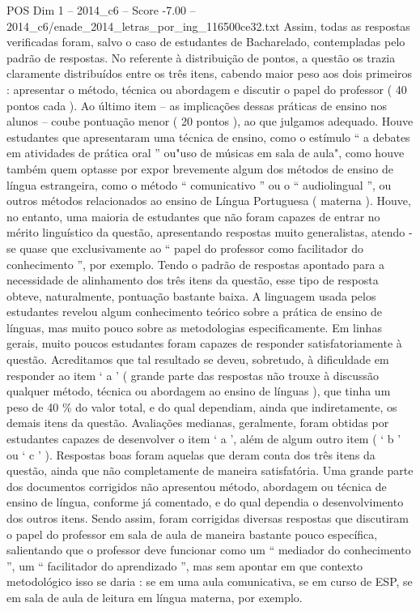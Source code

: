 \begin{textsample}{POS Dim 1 – 2014\_c6 – Score -7.00 – 2014\_c6/enade\_2014\_letras\_por\_ing\_116500ce32.txt}
Assim, todas as respostas verificadas foram, salvo o caso de estudantes de Bacharelado, contempladas pelo padrão de respostas.
No referente à distribuição de pontos, a questão os trazia claramente distribuídos entre os três itens, cabendo maior peso aos dois primeiros : apresentar o método, técnica ou abordagem e discutir o papel do professor ( 40 pontos cada ).
Ao último item – as implicações dessas práticas de ensino nos alunos – coube pontuação menor ( 20 pontos ), ao que julgamos adequado.
Houve estudantes que apresentaram uma técnica de ensino, como o estímulo “ a debates em atividades de prática oral ” ou"uso de músicas em sala de aula", como houve também quem optasse por expor brevemente algum dos métodos de ensino de língua estrangeira, como o método “ comunicativo ” ou o “ audiolingual ”, ou outros métodos relacionados ao ensino de Língua Portuguesa ( materna ).
Houve, no entanto, uma maioria de estudantes que não foram capazes de entrar no mérito linguístico da questão, apresentando respostas muito generalistas, atendo -se quase que exclusivamente ao “ papel do professor como facilitador do conhecimento ”, por exemplo.
Tendo o padrão de respostas apontado para a necessidade de alinhamento dos três itens da questão, esse tipo de resposta obteve, naturalmente, pontuação bastante baixa.
A linguagem usada pelos estudantes revelou algum conhecimento teórico sobre a prática de ensino de línguas, mas muito pouco sobre as metodologias especificamente.
Em linhas gerais, muito poucos estudantes foram capazes de responder satisfatoriamente à questão.
Acreditamos que tal resultado se deveu, sobretudo, à dificuldade em responder ao item ‘ a ’ ( grande parte das respostas não trouxe à discussão qualquer método, técnica ou abordagem ao ensino de línguas ), que tinha um peso de 40 \% do valor total, e do qual dependiam, ainda que indiretamente, os demais itens da questão.
Avaliações medianas, geralmente, foram obtidas por estudantes capazes de desenvolver o item ‘ a ’, além de algum outro item ( ‘ b ’ ou ‘ c ’ ).
Respostas boas foram aquelas que deram conta dos três itens da questão, ainda que não completamente de maneira satisfatória.
Uma grande parte dos documentos corrigidos não apresentou método, abordagem ou técnica de ensino de língua, conforme já comentado, e do qual dependia o desenvolvimento dos outros itens.
Sendo assim, foram corrigidas diversas respostas que discutiram o papel do professor em sala de aula de maneira bastante pouco específica, salientando que o professor deve funcionar como um “ mediador do conhecimento ”, um “ facilitador do aprendizado ”, mas sem apontar em que contexto metodológico isso se daria : se em uma aula comunicativa, se em curso de ESP, se em sala de aula de leitura em língua materna, por exemplo.

\end{textsample}
